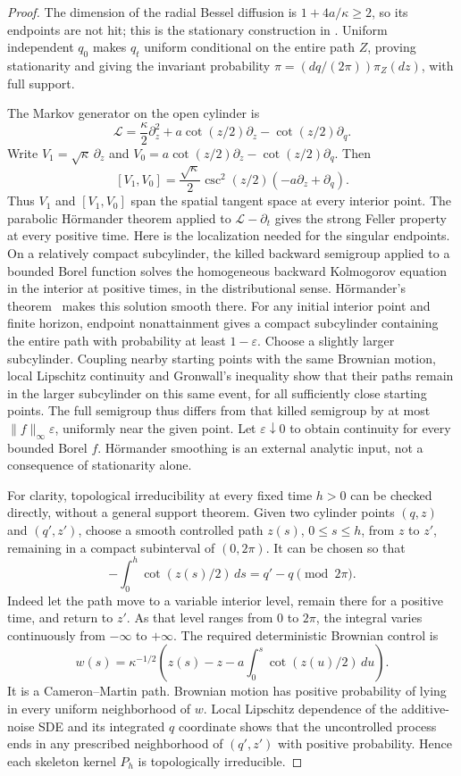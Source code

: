 \documentclass[11pt]{article}
\theoremstyle{definition}\newtheorem{definition}[theorem]{Definition}
\theoremstyle{remark}\newtheorem{remark}[theorem]{Remark}
\begin{document}
\begin{proof}
The dimension of the radial Bessel diffusion is
$1+4a/\kappa\ge2$, so its endpoints are not hit; this is the
stationary construction in \cite[Section 3 and Appendix B]{zhan-tip}.
Uniform independent $q_0$ makes $q_t$ uniform conditional on the
entire path $Z$, proving stationarity and giving the invariant
probability $\pi=(dq/(2\pi))\pi_Z(dz)$, with full support.

The Markov generator on the open cylinder is
\[
 \mathcal L=\frac\kappa2\partial_z^2
       +a\cot(z/2)\partial_z-\cot(z/2)\partial_q.
 \tag{WP10}
\]
Write $V_1=\sqrt\kappa\,\partial_z$ and
$V_0=a\cot(z/2)\partial_z-\cot(z/2)\partial_q$.  Then
\[
 [V_1,V_0]
   =\frac{\sqrt\kappa}{2}\csc^2(z/2)
                         (-a\partial_z+\partial_q).
 \tag{WP11}
\]
Thus $V_1$ and $[V_1,V_0]$ span the spatial tangent space at every
interior point.  The parabolic H\"ormander theorem applied to
$\mathcal L-\partial_t$ gives the strong Feller property at every
positive time.  Here is the localization needed for the singular
endpoints.  On a relatively compact subcylinder, the killed backward
semigroup applied to a bounded Borel function solves the homogeneous
backward Kolmogorov equation in the interior at positive times, in
the distributional sense.  H\"ormander's theorem~\cite[Theorem 1.1]{hormander} makes this solution
smooth there.  For any initial interior point and finite horizon,
endpoint nonattainment gives a compact subcylinder containing the
entire path with probability at least $1-\varepsilon$.  Choose a
slightly larger subcylinder.  Coupling nearby starting points with
the same Brownian motion, local Lipschitz continuity and Gronwall's
inequality show that their paths remain in the larger subcylinder
on this same event, for all sufficiently close starting points.
The full semigroup thus differs from that killed semigroup by at
most $\|f\|_\infty\varepsilon$, uniformly near the given point.
Let $\varepsilon\downarrow0$ to obtain continuity for every bounded
Borel $f$.  H\"ormander smoothing is an external analytic input,
not a consequence of stationarity alone.

For clarity, topological irreducibility at every fixed time $h>0$
can be checked directly, without a general support theorem.  Given
two cylinder points $(q,z)$ and $(q',z')$, choose a smooth controlled
path $z(s)$, $0\le s\le h$, from $z$ to $z'$, remaining in a
compact subinterval of $(0,2\pi)$.  It can be chosen so that
\[
 -\int_0^h\cot(z(s)/2)\,ds=q'-q\pmod{2\pi}.
\]
Indeed let the path move to a variable interior level, remain there
for a positive time, and return to $z'$.  As that level ranges from
$0$ to $2\pi$, the integral varies continuously from $-\infty$
to $+\infty$.  The required deterministic Brownian control is
\[
 w(s)=\kappa^{-1/2}\left(z(s)-z-
                     a\int_0^s\cot(z(u)/2)\,du\right).
\]
It is a Cameron--Martin path.  Brownian motion has positive
probability of lying in every uniform neighborhood of $w$.
Local Lipschitz dependence of the additive-noise SDE and its
integrated $q$ coordinate shows that the uncontrolled process ends
in any prescribed neighborhood of $(q',z')$ with positive
probability.  Hence each skeleton kernel $P_h$ is topologically
irreducible.


\end{proof}
\end{document}
